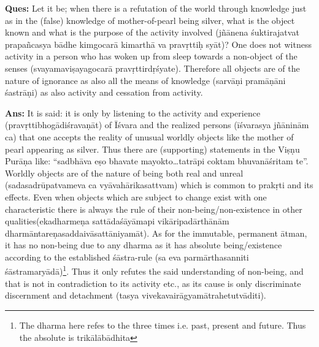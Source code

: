 \textbf{Ques:} Let it be; when there is a refutation of the world through knowledge just as in the (false) knowledge of mother-of-pearl being silver, what is the object known and what is the purpose of the activity involved  (jñānena śuktirajatvat prapañcasya bādhe kimgocarā kimarthā va pravṛttiḥ syāt)? One does not witness activity in a person who has woken up from sleep towards a non-object of the senses (svayamaviṣayagocarā pravṛttirdṛśyate). Therefore all objects are of the nature of ignorance as also all the means of knowledge (sarvāṇi pramāṇāni śastrāṇi) as also activity and cessation from activity. 

\vskip -2pt

\textbf{Ans:} It is said: it is only by listening to the activity and experience (pravṛttibhogādiśravaṇāt) of Īśvara and the realized persons (īśvarasya jñāninām ca) that one accepts the reality of unusual worldly objects like the mother of pearl appearing as silver. Thus there are (supporting) statements in the Viṣṇu Purāṇa like: “sadbhāva eṣo bhavate mayo\-kto…tatrāpi coktam bhuvanāśritam te”. Worldly objects are of the nature of being both real and unreal (sadasadrūpatvameva ca vyāvahāri\-kasattvam) which is common to prakṛti and its effects. Even when objects which are subject to change exist with one characteristic there is always the rule of their non-being/non-existence in other qualities\break (ekadharmeṇa sattādaśāyāmapi vikāripadārthānām dharmāntareṇa\break saddaivāsattāniyamāt). As for the immutable, permanent ātman, it has no non-being due to any dharma as it has absolute being/existence according to the established śāstra-rule (sa eva parmārthasanniti śāstramaryādā)\footnote{The dharma here refes to the three times i.e. past, present and future. Thus the absolute is trikālābādhita}. Thus it only refutes the said understanding of non-being, and that is not in contradiction to its activity etc., as its cause is only discriminate discernment and detachment (tasya vivekavairāgyamātrahetutvāditi).

